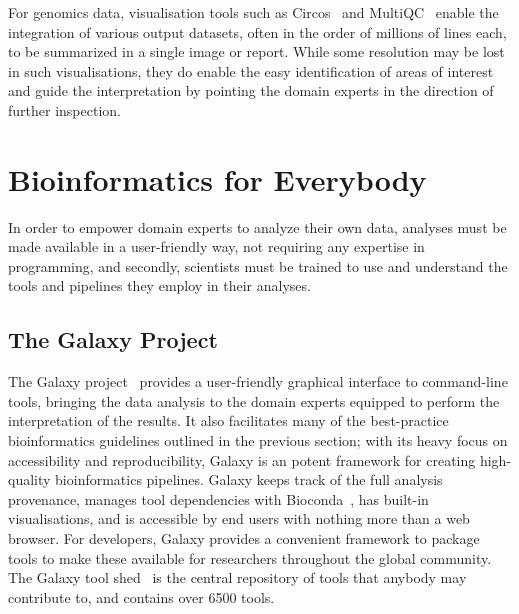 \begin{justify}
For genomics data, visualisation tools such as Circos~\cite{circos} and MultiQC~\cite{ewels2016multiqc} enable the integration of various output datasets, often in the order of millions of lines each, to be summarized in a single image or report. While some resolution may be lost in such visualisations, they do enable the easy identification of areas of interest and guide the interpretation by pointing the domain experts in the direction of further inspection.


\section{Bioinformatics for Everybody}

In order to empower domain experts to analyze their own data, analyses must be made available in a user-friendly way, not requiring any expertise in programming, and secondly, scientists must be trained to use and understand the tools and pipelines they employ in their analyses.

\subsection{The Galaxy Project}
The Galaxy project~\cite{afgan2016galaxy} provides a user-friendly graphical interface to command-line tools, bringing the data analysis to the domain experts equipped to perform the interpretation of the results. It also facilitates many of the best-practice bioinformatics guidelines outlined in the previous section; with its heavy focus on accessibility and reproducibility, Galaxy is an potent framework for creating high-quality bioinformatics pipelines. Galaxy keeps track of the full analysis provenance, manages tool dependencies with Bioconda~\cite{gruning2017bioconda}, has built-in visualisations, and is accessible by end users with nothing more than a web browser. For developers, Galaxy provides a convenient framework to package tools to make these available for researchers throughout the global community. The Galaxy tool shed~\cite{url-toolshed} is the central repository of tools that anybody may contribute to, and contains over 6500 tools.


\end{justify}
